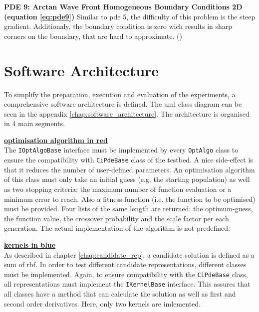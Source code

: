 \documentclass[./\jobname.tex]{subfiles}
\begin{document}
\textbf{PDE 9: Arctan Wave Front Homogeneous Boundary Conditions 2D (equation \ref{eq:pde9})} Similar to \gls{pde} 5, the difficulty of this problem is the steep gradient. Additionaly, the boundary condition is zero wich results in sharp corners on the boundary, that are hard to approximate. (\cite{mitchell_nist_2018})


\section{Software Architecture}



To simplify the preparation, execution and evaluation of the experiments, a comprehensive software architecture is defined. The \gls{uml} class diagram can be seen in the appendix \ref{chap:software_architecture}. The architecture is organised in 4 main segments. 

\textcolor{opt_algo_colour}{\large \underline{\textbf{optimisation algorithm in red}}} \\
The \colorbox{light-gray}{\lstinline[basicstyle=\ttfamily\color{black}]|IOptAlgoBase|} interface must be implemented by every \colorbox{light-gray}{\lstinline[basicstyle=\ttfamily\color{black}]|OptAlgo|} class to ensure the compatibility with \colorbox{light-gray}{\lstinline[basicstyle=\ttfamily\color{black}]|CiPdeBase|} class of the testbed. A nice side-effect is that it reduces the number of user-defined parameters. An optimisation algorithm of this class must only take an initial guess (e.g. the starting population) as well as two stopping criteria: the maximum number of function evaluation or a minimum error to reach. Also a fitness function (i.e. the function to be optimised) must be provided. Four lists of the same length are returned: the optimum-guess, the function value, the crossover probability and the scale factor per each generation. The actual implementation of the algorithm is not predefined. 

\textcolor{kernels_colour}{\large \underline{\textbf{kernels in blue}}} \\
As described in chapter \ref{chap:candidate_rep}, a candidate solution is defined as a sum of \gls{rbf}. In order to test different candidate representations, different classes must be implemented. Again, to ensure compatibility with the \colorbox{light-gray}{\lstinline[basicstyle=\ttfamily\color{black}]|CiPdeBase|} class, all representations must implement the \colorbox{light-gray}{\lstinline[basicstyle=\ttfamily\color{black}]|IKernelBase|} interface. This assures that all classes have a method that can calculate the solution as well as first and second order derivatives. Here, only two kernels are imlemented.
\end{document}
